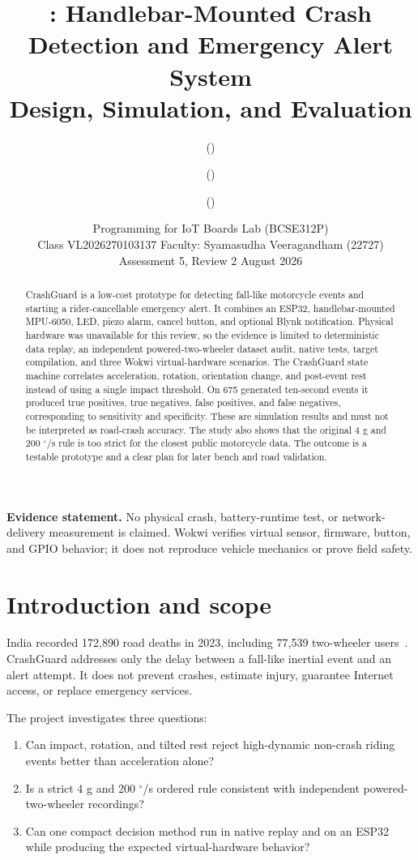\documentclass[12pt,a4paper]{article}
\title{\textbf{\ProjName: Handlebar-Mounted Crash Detection and Emergency Alert System}\\
\large Design, Simulation, and Evaluation}
\author{\TeamMemberA{} (\TeamRegA) \and
        \TeamMemberB{} (\TeamRegB) \and
        \TeamMemberC{} (\TeamRegC)}
\date{Programming for IoT Boards Lab (BCSE312P)\\
Class VL2026270103137 \quad Faculty: Syamasudha Veeragandham (22727)\\
Assessment 5, Review 2 \quad 28 August 2026}
\newcommand{\degree}{\ensuremath{^{\circ}}}
\begin{document}
\maketitle

\begin{abstract}
CrashGuard is a low-cost prototype for detecting fall-like motorcycle events
and starting a rider-cancellable emergency alert. It combines an ESP32,
handlebar-mounted MPU-6050, LED, piezo alarm, cancel button, and optional Blynk
notification. Physical hardware was unavailable for this review, so the
evidence is limited to deterministic data replay, an independent
powered-two-wheeler dataset audit, native tests, target compilation, and three
Wokwi virtual-hardware scenarios. The CrashGuard state machine correlates
acceleration, rotation, orientation change, and post-event rest instead of
using a single impact threshold. On 675 generated ten-second events it
produced \CrashGuardTP{} true positives, \CrashGuardTN{} true negatives,
\CrashGuardFP{} false positives, and \CrashGuardFN{} false negatives,
corresponding to \CrashGuardSensitivity{} sensitivity and
\CrashGuardSpecificity{} specificity. These are
simulation results and must not be interpreted as road-crash accuracy. The
study also shows that the original 4 g and 200 $\degree$/s rule is too strict
for the closest public motorcycle data. The outcome is a testable prototype
and a clear plan for later bench and road validation.
\end{abstract}

\noindent\textbf{Evidence statement.}
No physical crash, battery-runtime test, or network-delivery measurement is
claimed. Wokwi verifies virtual sensor, firmware, button, and GPIO behavior;
it does not reproduce vehicle mechanics or prove field safety.

\clearpage
\tableofcontents
\clearpage

\section{Introduction and scope}

India recorded 172,890 road deaths in 2023, including 77,539 two-wheeler
users~\cite{morth2023}. CrashGuard addresses only the delay between a
fall-like inertial event and an alert attempt. It does not prevent crashes,
estimate injury, guarantee Internet access, or replace emergency services.

The project investigates three questions:

\begin{enumerate}[label=\textbf{RQ\arabic*:}]
  \item Can impact, rotation, and tilted rest reject high-dynamic non-crash
        riding events better than acceleration alone?
  \item Is a strict 4 g and 200 $\degree$/s ordered rule consistent with independent
        powered-two-wheeler recordings?
  \item Can one compact decision method run in native replay and on an ESP32
        while producing the expected virtual-hardware behavior?
\end{enumerate}
\end{document}
